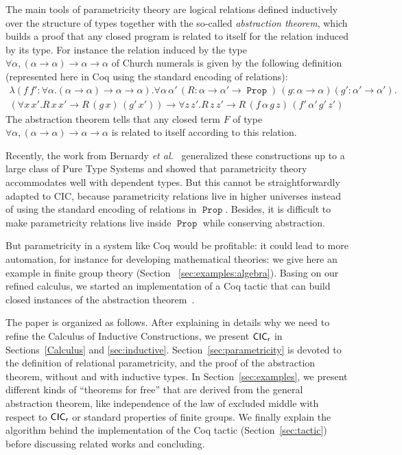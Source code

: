 \documentclass[a4paper,USenglish]{lipics}
\DeclareMathOperator{\Prop}{\mathtt{Prop}}
\def\coq{\textsf{Coq}\xspace}
\def\cic{\textsf{CIC}\xspace}
\def\cicr{$\text{\textsf{CIC}}_{\text{\textsf{r}}}$\xspace}
\begin{document}
The main tools of parametricity theory are logical relations defined
inductively over the structure of types together with the so-called
\emph{abstraction theorem}, which builds a proof that any closed program is related to itself for the
relation induced by its type. For instance the relation induced by the type
$∀α,(α → α) → α → α$ of Church numerals is given by the following definition
(represented here in \coq using the standard encoding of relations):
\begin{align*}
 λ(f\,f': ∀α.(α → α) → α → α). ∀ α\,α'\,(R : α → α'→ \Prop)\,(g : α → α) (g' : α' → α').& \\
(∀ x\,x'. R\,x\,x' → R\,(g\,x)\,(g'\,x')) → ∀ z\,z'. R\,z\,z' → R\,(f\,α\,g\,z)\,(f'\,α'\,g'\,z')&
\end{align*}
The abstraction theorem tells that any closed term $F$ of
type $∀α,(α → α) → α → α$ is related to itself according to this relation.

Recently, the work from Bernardy \emph{et
al.}~\cite{DBLP:conf/icfp/BernardyJP10} generalized these constructions up
to a large class of Pure Type Systems and showed that parametricity theory
accommodates well with dependent types. But this cannot be straightforwardly
adapted to \cic, because parametricity relations live in higher universes
instead of using the standard encoding of relations in $\Prop$. Besides,
it is difficult to make parametricity relations live inside $\Prop$ while
conserving abstraction.

But parametricity in a system like \coq would be profitable: it could lead to
more automation, for instance for developing mathematical theories: we
give here an example in finite group theory (Section ~\ref{sec:examples:algebra}). Basing on our refined calculus,
we started an implementation of a \coq tactic that can build closed instances
of the abstraction theorem~\cite{implem12}.

The paper is organized as follows. After explaining in details why we
need to refine the Calculus of Inductive Constructions, we present
\cicr in Sections~\ref{Calculus} and \ref{sec:inductive}.
Section~\ref{sec:parametricity} is devoted to the definition of
relational parametricity, and the proof of the abstraction
theorem, without and with inductive types. In
Section~\ref{sec:examples}, we present different kinds of ``theorems for
free'' that are derived from the general abstraction theorem, like
independence of the law of excluded middle with respect to \cicr or standard
properties of finite groups. We finally
explain the algorithm behind the implementation of the \coq tactic
(Section~\ref{sec:tactic}) before discussing related works and
concluding.
\end{document}
